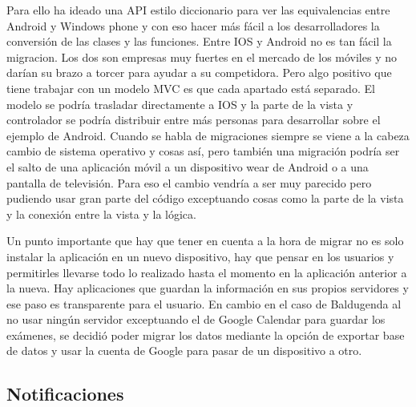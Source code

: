 Para ello ha ideado una API estilo diccionario para ver las equivalencias entre Android y Windows phone y con eso hacer más fácil a los desarrolladores la conversión de las clases y las funciones.
Entre IOS y Android no es tan fácil la migracion. Los dos son empresas muy fuertes en el mercado de los móviles y no darían su brazo a torcer para ayudar a su competidora.
Pero algo positivo que tiene trabajar con un modelo MVC es que cada apartado está separado.
El modelo se podría trasladar directamente a IOS y la parte de la vista y controlador se podría distribuir entre más personas para desarrollar sobre el ejemplo de Android.
Cuando se habla de migraciones siempre se viene a la cabeza cambio de sistema operativo y cosas así, pero también una migración podría ser el salto de una aplicación móvil a un dispositivo wear de Android o a una pantalla de televisión. Para eso el cambio vendría a ser muy parecido pero pudiendo usar gran parte del código exceptuando cosas como la parte de la vista y la conexión entre la vista y la lógica.

Un punto importante que hay que tener en cuenta a la hora de migrar no es solo instalar la aplicación en un nuevo dispositivo, hay que pensar en los usuarios y permitirles llevarse todo lo realizado hasta el momento en la aplicación anterior a la nueva.
Hay aplicaciones que guardan la información en sus propios servidores y ese paso es transparente para el usuario.
En cambio en el caso de Baldugenda al no usar ningún servidor exceptuando el de Google Calendar para guardar los exámenes, se decidió poder migrar los datos mediante la opción de exportar base de datos y usar la cuenta de Google para pasar de un dispositivo a otro.

\subsection{Notificaciones}
\label{subsecc:Notificaciones}

